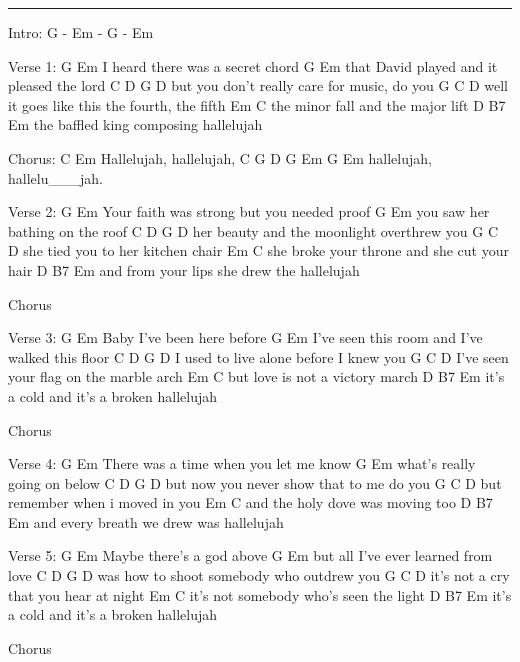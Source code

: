 \noindent\rule{\columnwidth}{1pt}


\begin{multicols}{2}
\begin{lstsong}
Intro: G - Em - G - Em

Verse 1:
   G                Em
I heard there was a secret chord
     G                   Em
that David played and it pleased the lord
    C                D                  G   D
but you don't really care for music, do you
     G                     C           D
well it goes like this the fourth, the fifth
    Em                 C
the minor fall and the major lift
    D                B7         Em
the baffled king composing hallelujah

Chorus:
     C            Em
Hallelujah,  hallelujah,
     C           G  D  G   Em   G   Em
hallelujah, hallelu___jah.

Verse 2:
     G                        Em
Your faith was strong but you needed proof
    G               Em
you saw her bathing on the roof
    C              D                    G   D
her beauty and the moonlight overthrew you
    G               C       D
she tied you to her kitchen chair
    Em                        C
she broke your throne and she cut your hair
    D                  B7           Em
and from your lips she drew the hallelujah

Chorus









Verse 3:
G               Em
Baby I've been here before
     G                       Em
I've seen this room and I've walked this floor
  C             D                   G    D
I used to live alone before I knew you
     G                     C       D
I've seen your flag on the marble arch
    Em             C
but love is not a victory march
       D               B7          Em
it's a cold and it's a broken hallelujah

Chorus

Verse 4:
      G                   Em
There was a time when you let me know
       G            Em
what's really going on below
    C             D                   G    D
but now you never show that to me do you
      G             C          D
but remember when i moved in you
        Em            C
and the holy dove was moving too
    D                B7          Em
and every breath we drew was hallelujah

Verse 5:
G               Em
Maybe there's a god above
    G             Em
but all I've ever learned from love
    C            D                       G  D
was how to shoot somebody who outdrew you
     G                  C       D
it's not a cry that you hear at night
     Em                  C
it's not somebody who's seen the light
       D               B7         Em
it's a cold and it's a broken hallelujah


Chorus
\end{lstsong}
\end{multicols}
\newpage




